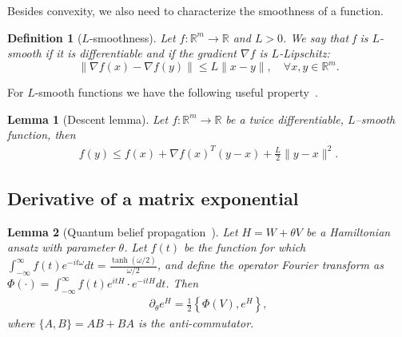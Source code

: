 \documentclass[
    aps,
    prx,
    onecolumn
]{revtex4-2}
\newtheorem{definition}{Definition}
\newtheorem{lemma}{Lemma}
\begin{document}
Besides convexity, we also need to characterize the smoothness of a function.

\begin{definition}[$L$-smoothness]
\label{def:smooth}
Let $f:\mathbb{R}^m \rightarrow \mathbb{R}$ and $L > 0$. We say that f is $L$-smooth if it is differentiable
and if the gradient $\nabla f$ is $L$-Lipschitz:
\begin{equation}
\| \nabla f(x) - \nabla f(y) \| \leq L \| x - y \|, \quad \forall x, y \in \mathbb{R}^m.
\end{equation}
\end{definition}

For $L$-smooth functions we have the following useful property~\cite{Garrigos2023}.

\begin{lemma}[Descent lemma]
\label{lem:descent}
Let $f: \mathbb{R}^m \rightarrow \mathbb{R}$ be a twice differentiable, $L$–smooth function, then
\begin{align}
f(y) \leq f(x) + \nabla f(x)^T (y-x) + \frac{L}{2} \| y -x \|^2 .
\end{align}
\end{lemma}

\subsection{Derivative of a matrix exponential}

\begin{lemma}[Quantum belief propagation~\cite{Hastings_2007}] 
Let $H=W+\theta V$ be a Hamiltonian ansatz with parameter $\theta$. Let $f(t)$ be the function for which $\int_{-\infty}^\infty f(t) e^{-i t \omega} dt = \frac{\tanh(\omega/2)}{\omega/2}$, and define the operator Fourier transform as $\Phi( \cdot ) = \int_{-\infty}^{\infty} f(t) e^{itH} \cdot e^{-itH} dt$. Then
\begin{align}
\partial_\theta e^H = \frac{1}{2} \left\{ \Phi(V) , e^H\right\},
\end{align}
where $\{A, B\} = AB + BA$ is the anti-commutator.
\end{lemma}
\end{document}
